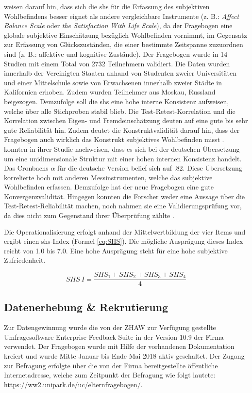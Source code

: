  weisen darauf hin, dass sich die \acrshort{shs} für die Erfassung des subjektiven Wohlbefindens besser eignet als andere vergleichbare Instrumente (z. B.: \textit{Affect Balance Scale} oder \textit{the Satisfaction With Life Scale}), da der Fragebogen eine globale subjektive Einschätzung bezüglich Wohlbefinden vornimmt, im Gegensatz zur Erfassung von Glückszuständen, die einer bestimmte Zeitspanne zuzuordnen sind (z. B.: affektive und kognitive Zustände). Der Fragebogen wurde in 14 Studien mit einem Total von 2732 Teilnehmern validiert. Die Daten wurden innerhalb der Vereinigten Staaten anhand von Studenten zweier Universitäten und einer Mittelschule sowie von Erwachsenen innerhalb zweier Städte in Kalifornien erhoben. Zudem wurden Teilnehmer aus Moskau, Russland beigezogen. Demzufolge soll die \acrshort{shs} eine hohe interne Konsistenz aufweisen, welche über alle Stichproben stabil blieb. Die Test-Retest-Korrelation und die Korrelation zwischen Eigen- und Fremdeinschätzung deuten auf eine gute bis sehr gute Reliabilität hin.  
Zudem deutet die Konstruktvalidität darauf hin, dass der Fragebogen auch wirklich das Konstrukt subjektives Wohlbefinden misst \cite{Lyubomirsky1999}.  konnten in ihrer Studie nachweisen, dass es sich bei der deutschen Übersetzung um eine unidimensionale Struktur mit einer hohen internen Konsistenz handelt. Das Cronbachs $\alpha$ für die deutsche Version belief sich auf .82. Diese Übersetzung korrelierte hoch mit anderen Messinstrumenten, welche das subjektive Wohlbefinden erfassen. Demzufolge hat der neue Fragebogen eine gute Konvergenzvalidität. Hingegen konnten die Forscher weder eine Aussage über die Test-Retest-Reliabilität machen, noch nahmen sie eine Validierungsprüfung vor, da dies nicht zum Gegenstand ihrer Überprüfung zählte \cite{Swami2009}.

Die Operationalisierung erfolgt anhand der Mittelwertbildung der vier Items \cite{Lyubomirsky1999} und ergibt einen \acrshort{shs}-Index (Formel \ref{eq:SHS}). Die mögliche Ausprägung dieses Index reicht von 1.0 bis 7.0. Eine hohe Ausprägung steht für eine hohe subjektive Zufriedenheit.

\begin{equation}\label{eq:SHS}
    SHS~I=\frac{SHS_{1}+SHS_{2}+SHS_{3}+SHS_{4}}{4}
\end{equation}



\subsection{Datenerhebung \& Rekrutierung}\label{sec:Datenerhebung}
Zur Datengewinnung wurde die von der ZHAW zur Verfügung gestellte Umfragesoftware Enterprise Feedback Suite in der Version 10.9 der Firma  verwendet. Der Fragebogen wurde mit Hilfe der vorhandenen Dokumentation kreiert \cite{EFS2016} und wurde Mitte Januar bis Ende Mai 2018 aktiv geschaltet.  Der Zugang zur Befragung erfolgte über die von der Firma  bereitgestellte öffentliche Internetadresse, welche zum Zeitpunkt der Befragung wie folgt lautete: https://ww2.unipark.de/uc/elternfragebogen/.

